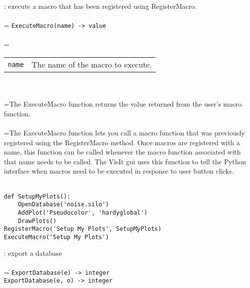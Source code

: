 \documentclass[10pt,a4paper]{report}
\begin{document}
{}
: execute a macro that has been registered using RegisterMacro.\\[-3mm]

 \\ 
\hangindent=\parindent 
\verb!ExecuteMacro(name) -> value!\\ [-3mm]

 \\ 
\hangindent=\parindent 
\begin{tabular}{ll}
\verb!name! & The name of the macro to execute. \\
\end{tabular} \\[-2mm]


 \\ 
\hangindent=\parindent The ExecuteMacro function returns the value returned from the user's macro function. \\[-3mm] 

 \\ 
\hangindent=\parindent The ExecuteMacro function lets you call a macro function that was previously registered using the RegisterMacro method. Once macros are registered with a name, this function can be called whenever the macro function associated with that name needs to be called. The VisIt gui uses this function to tell the Python interface when macros need to be executed in response to user button clicks. \\[-3mm] 

\\[-6mm]
\begin{verbatim}def SetupMyPlots():
    OpenDatabase('noise.silo')
    AddPlot('Pseudocolor', 'hardyglobal')
    DrawPlots()
RegisterMacro('Setup My Plots', SetupMyPlots)
ExecuteMacro('Setup My Plots')
\end{verbatim}
\newpage


{}
: export a database\\[-3mm]

 \\ 
\hangindent=\parindent 
\verb!ExportDatabase(e) -> integer!\\ 
\verb!ExportDatabase(e, o) -> integer!\\ [-3mm]
\end{document}
